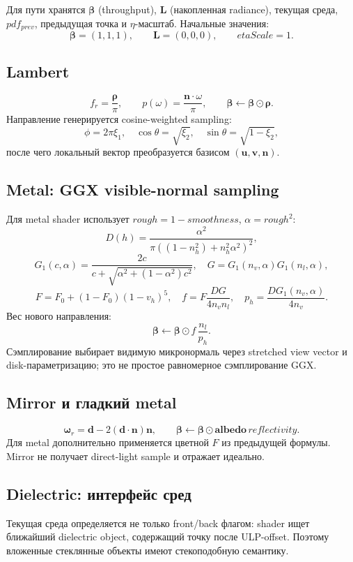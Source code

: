 \documentclass[11pt,a4paper]{article}
\newcommand{\vect}[1]{\boldsymbol{#1}}
\begin{document}
Для пути хранятся $\vect\beta$ (throughput), $\vect L$ (накопленная radiance),
текущая среда, $pdf_{prev}$, предыдущая точка и $\eta$-масштаб. Начальные значения:
\[
 \vect\beta=(1,1,1),\qquad \vect L=(0,0,0),\qquad etaScale=1.
\]

\subsection{Lambert}

\[
 f_r=\frac{\vect\rho}{\pi},\qquad
 p(\omega)=\frac{\vect n\cdot\omega}{\pi},\qquad
 \vect\beta\leftarrow\vect\beta\odot\vect\rho.
\]
Направление генерируется cosine-weighted sampling:
\[
 \phi=2\pi\xi_1,\quad \cos\theta=\sqrt{\xi_2},\quad
 \sin\theta=\sqrt{1-\xi_2},
\]
после чего локальный вектор преобразуется базисом $(\vect u,\vect v,\vect n)$.

\subsection{Metal: GGX visible-normal sampling}

Для metal shader использует $rough=1-smoothness$, $\alpha=rough^2$:
\[
 D(h)=\frac{\alpha^2}{\pi((1-n_h^2)+n_h^2\alpha^2)^2},
\]
\[
 G_1(c,\alpha)=\frac{2c}{c+\sqrt{\alpha^2+(1-\alpha^2)c^2}},
 \quad G=G_1(n_v,\alpha)G_1(n_l,\alpha),
\]
\[
 F=F_0+(1-F_0)(1-v_h)^5,
 \quad f=F\frac{DG}{4n_vn_l},
 \quad p_h=\frac{DG_1(n_v,\alpha)}{4n_v}.
\]
Вес нового направления:
\[
 \vect\beta\leftarrow\vect\beta\odot f\,\frac{n_l}{p_h}.
\]
Сэмплирование выбирает видимую микронормаль через stretched view vector и
disk-параметризацию; это не простое равномерное сэмплирование GGX.

\subsection{Mirror и гладкий metal}

\[
 \vect\omega_r=\vect d-2(\vect d\cdot\vect n)\vect n,
 \qquad \vect\beta\leftarrow\vect\beta\odot\vect{albedo}\,reflectivity.
\]
Для metal дополнительно применяется цветной $F$ из предыдущей формулы. Mirror
не получает direct-light sample и отражает идеально.

\subsection{Dielectric: интерфейс сред}

Текущая среда определяется не только front/back флагом: shader ищет ближайший
dielectric object, содержащий точку после ULP-offset. Поэтому вложенные стеклянные
объекты имеют стекоподобную семантику.
\end{document}
